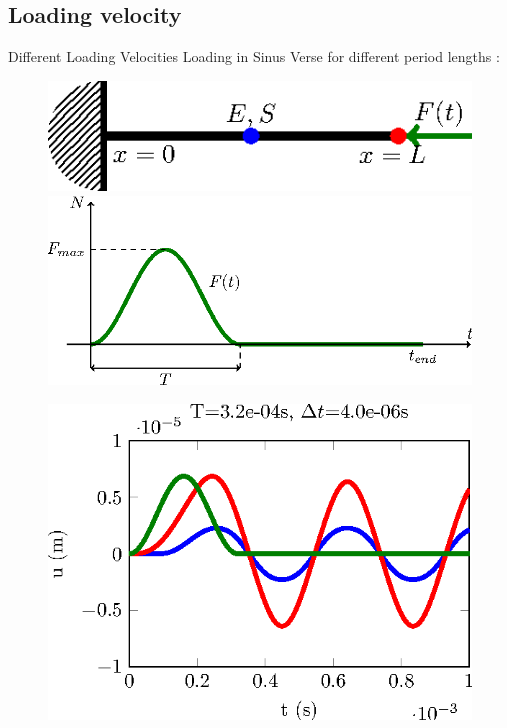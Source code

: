 \documentclass[12pt]{beamer}
\begin{document}
\subsection{Loading velocity}

\begin{frame}{Different Loading Velocities} 
	Loading in Sinus Verse for different period lengths :
	
	\begin{figure}
		\begin{minipage}[b]{0.4\linewidth}
			\includegraphics[width=1\linewidth]{Beam-tikz.eps}
		\end{minipage}
		 \hspace{1cm}
		\begin{minipage}[b]{0.4\linewidth}
			\includegraphics[width=1\linewidth]{SinVerse-tikz.eps}
		\end{minipage}
	\end{figure}
	\begin{figure}
		\begin{minipage}{0.24\linewidth}
			\includegraphics[width=1\linewidth]{CalculSchem3-T4-tikz.eps}

\end{minipage}
\end{figure}
\end{frame}
\end{document}
